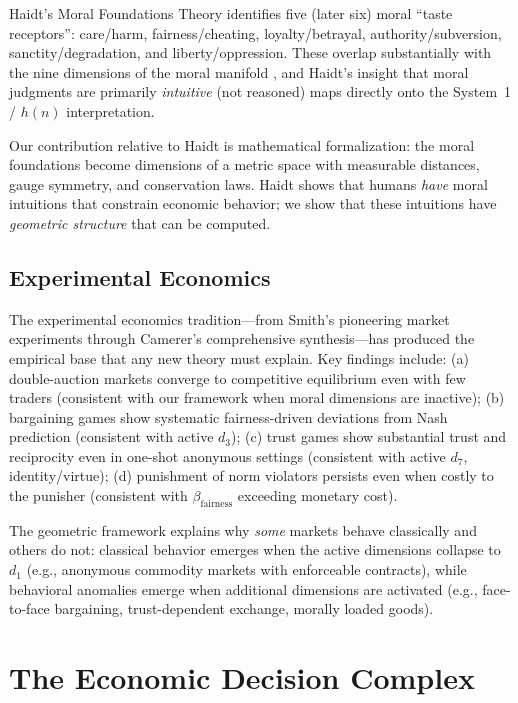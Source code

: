 \documentclass[12pt]{article}
\theoremstyle{definition}
\theoremstyle{remark}
\begin{document}
Haidt's Moral Foundations Theory \cite{haidt2012} identifies five (later six) moral ``taste receptors'': care/harm, fairness/cheating, loyalty/betrayal, authority/subversion, sanctity/degradation, and liberty/oppression.  These overlap substantially with the nine dimensions of the moral manifold \cite{bond2026geometric}, and Haidt's insight that moral judgments are primarily \emph{intuitive} (not reasoned) maps directly onto the System~1 / $h(n)$ interpretation.

Our contribution relative to Haidt is mathematical formalization: the moral foundations become dimensions of a metric space with measurable distances, gauge symmetry, and conservation laws.  Haidt shows that humans \emph{have} moral intuitions that constrain economic behavior; we show that these intuitions have \emph{geometric structure} that can be computed.

\subsection{Experimental Economics}

The experimental economics tradition---from Smith's \cite{smith1962} pioneering market experiments through Camerer's \cite{camerer2003} comprehensive synthesis---has produced the empirical base that any new theory must explain.  Key findings include: (a) double-auction markets converge to competitive equilibrium even with few traders (consistent with our framework when moral dimensions are inactive); (b) bargaining games show systematic fairness-driven deviations from Nash prediction (consistent with active $d_3$); (c) trust games show substantial trust and reciprocity even in one-shot anonymous settings (consistent with active $d_7$, identity/virtue); (d) punishment of norm violators persists even when costly to the punisher (consistent with $\beta_{\text{fairness}}$ exceeding monetary cost).

The geometric framework explains why \emph{some} markets behave classically and others do not: classical behavior emerges when the active dimensions collapse to $d_1$ (e.g., anonymous commodity markets with enforceable contracts), while behavioral anomalies emerge when additional dimensions are activated (e.g., face-to-face bargaining, trust-dependent exchange, morally loaded goods).


\section{The Economic Decision Complex}
\label{sec:manifold}
\end{document}
